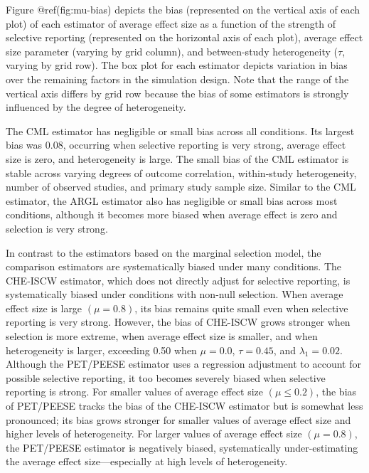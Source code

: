 \documentclass[
]{article}
\begin{document}
Figure @ref(fig:mu-bias) depicts the bias (represented on the vertical
axis of each plot) of each estimator of average effect size as a
function of the strength of selective reporting (represented on the
horizontal axis of each plot), average effect size parameter (varying by
grid column), and between-study heterogeneity (\(\tau\), varying by grid
row). The box plot for each estimator depicts variation in bias over the
remaining factors in the simulation design. Note that the range of the
vertical axis differs by grid row because the bias of some estimators is
strongly influenced by the degree of heterogeneity.

The CML estimator has negligible or small bias across all conditions.
Its largest bias was 0.08, occurring when selective reporting is very
strong, average effect size is zero, and heterogeneity is large. The
small bias of the CML estimator is stable across varying degrees of
outcome correlation, within-study heterogeneity, number of observed
studies, and primary study sample size. Similar to the CML estimator,
the ARGL estimator also has negligible or small bias across most
conditions, although it becomes more biased when average effect is zero
and selection is very strong.

In contrast to the estimators based on the marginal selection model, the
comparison estimators are systematically biased under many conditions.
The CHE-ISCW estimator, which does not directly adjust for selective
reporting, is systematically biased under conditions with non-null
selection. When average effect size is large \((\mu = 0.8)\), its bias
remains quite small even when selective reporting is very strong.
However, the bias of CHE-ISCW grows stronger when selection is more
extreme, when average effect size is smaller, and when heterogeneity is
larger, exceeding 0.50 when \(\mu = 0.0\), \(\tau = 0.45\), and
\(\lambda_1 = 0.02\). Although the PET/PEESE estimator uses a regression
adjustment to account for possible selective reporting, it too becomes
severely biased when selective reporting is strong. For smaller values
of average effect size \((\mu \leq 0.2)\), the bias of PET/PEESE tracks
the bias of the CHE-ISCW estimator but is somewhat less pronounced; its
bias grows stronger for smaller values of average effect size and higher
levels of heterogeneity. For larger values of average effect size
\((\mu = 0.8)\), the PET/PEESE estimator is negatively biased,
systematically under-estimating the average effect size---especially at
high levels of heterogeneity.
\end{document}
